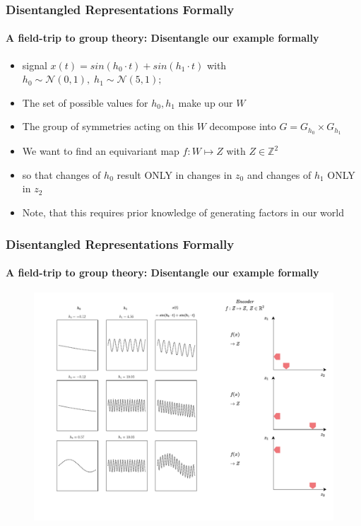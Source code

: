 \documentclass[9pt]{beamer}
\begin{document}
\begin{frame}
\frametitle{Disentangled Representations Formally}
\framesubtitle{A field-trip to group theory: Disentangle our example formally}
\begin{itemize}%
	\item signal $x(t) = sin(h_0 \cdot t) + sin(h_1 \cdot t)$ with $h_0 \sim \mathcal{N}(0,1),\;h_1 \sim \mathcal{N}(5,1);$
	\item The set of possible values for $h_0, h_1$ make up our $W$
	\item The group of symmetries acting on this $W$ decompose into $G = G_{h_0} \times G_{h_1}$
	\item We want to find an equivariant map $f:W\mapsto Z$ with $Z \in \mathbb{Z}^2$
	\item so that changes of $h_0$ result ONLY in changes in $z_0$ and changes of $h_1$ ONLY in $z_2$
	\item Note, that this requires prior knowledge of generating factors in our world
\end{itemize}
\end{frame} 


\begin{frame}
\frametitle{Disentangled Representations Formally}
\framesubtitle{A field-trip to group theory: Disentangle our example formally}
\begin{figure}
	\includegraphics[width=1\linewidth]{figures/intution_3x3.pdf}
\end{figure}
\end{frame} 
\end{document}
